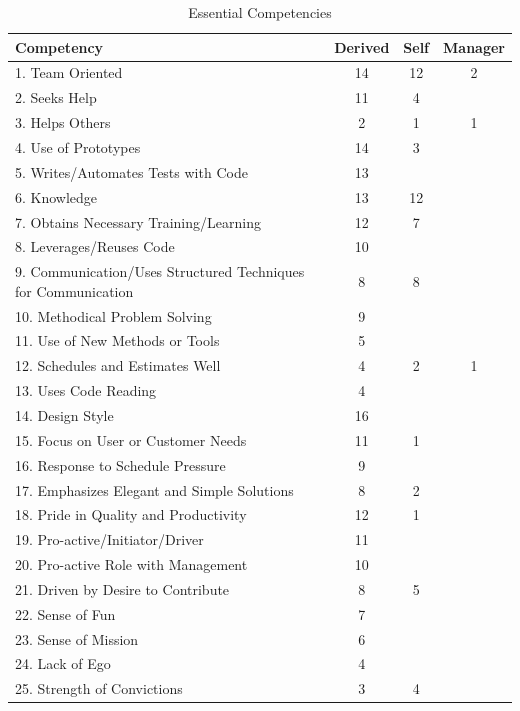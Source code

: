 \begin{table}[h!]
    \centering
    \caption{Essential Competencies}
    \begin{tabular}{|l|c|c|c|}
    \hline
    \textbf{Competency} & \textbf{Derived} & \textbf{Self} & \textbf{Manager} \\ \hline
    1. Team Oriented & 14 & 12 & 2 \\ \hline
    2. Seeks Help & 11 & 4 &  \\ \hline
    3. Helps Others & 2 & 1 & 1 \\ \hline
    4. Use of Prototypes & 14 & 3 &  \\ \hline
    5. Writes/Automates Tests with Code & 13 &  &  \\ \hline
    6. Knowledge & 13 & 12 &  \\ \hline
    7. Obtains Necessary Training/Learning & 12 & 7 &  \\ \hline
    8. Leverages/Reuses Code & 10 &  &  \\ \hline
    9. Communication/Uses Structured Techniques for Communication & 8 & 8 &  \\ \hline
    10. Methodical Problem Solving & 9 &  &  \\ \hline
    11. Use of New Methods or Tools & 5 &  &  \\ \hline
    12. Schedules and Estimates Well & 4 & 2 & 1 \\ \hline
    13. Uses Code Reading & 4 &  &  \\ \hline
    14. Design Style & 16 &  &  \\ \hline
    15. Focus on User or Customer Needs & 11 & 1 &  \\ \hline
    16. Response to Schedule Pressure & 9 &  &  \\ \hline
    17. Emphasizes Elegant and Simple Solutions & 8 & 2 &  \\ \hline
    18. Pride in Quality and Productivity & 12 & 1 &  \\ \hline
    19. Pro-active/Initiator/Driver & 11 &  &  \\ \hline
    20. Pro-active Role with Management & 10 &  &  \\ \hline
    21. Driven by Desire to Contribute & 8 & 5 &  \\ \hline
    22. Sense of Fun & 7 &  &  \\ \hline
    23. Sense of Mission & 6 &  &  \\ \hline
    24. Lack of Ego & 4 &  &  \\ \hline
    25. Strength of Convictions & 3 & 4 &  \\ \hline

\end{tabular}
\end{table}
